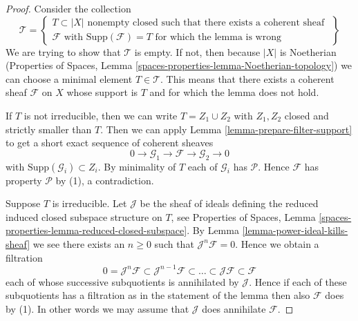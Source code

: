 \begin{proof}
Consider the collection
$$
\mathcal{T} =
\left\{
\begin{matrix}
T \subset |X|
\text{ nonempty closed such that there exists a coherent sheaf } \\
\mathcal{F}
\text{ with }
\text{Supp}(\mathcal{F}) = T
\text{ for which the lemma is wrong}
\end{matrix}
\right\}
$$
We are trying to show that $\mathcal{T}$ is empty. If not, then
because $|X|$ is Noetherian (Properties of Spaces, Lemma
\ref{spaces-properties-lemma-Noetherian-topology})
we can choose a minimal element $T \in \mathcal{T}$. This means that
there exists a coherent sheaf $\mathcal{F}$ on $X$ whose support is $T$
and for which the lemma does not hold.

\medskip\noindent
If $T$ is not irreducible, then we can write $T = Z_1 \cup Z_2$
with $Z_1, Z_2$ closed and strictly smaller than $T$.
Then we can apply Lemma \ref{lemma-prepare-filter-support}
to get a short exact sequence of coherent sheaves
$$
0 \to
\mathcal{G}_1 \to
\mathcal{F} \to
\mathcal{G}_2 \to 0
$$
with $\text{Supp}(\mathcal{G}_i) \subset Z_i$. By minimality of
$T$ each of $\mathcal{G}_i$ has $\mathcal{P}$. Hence $\mathcal{F}$
has property $\mathcal{P}$ by (1), a contradiction.

\medskip\noindent
Suppose $T$ is irreducible. Let $\mathcal{J}$ be the sheaf of ideals
defining the reduced induced closed subspace structure on $T$,
see Properties of Spaces, Lemma
\ref{spaces-properties-lemma-reduced-closed-subspace}.
By Lemma \ref{lemma-power-ideal-kills-sheaf} we see there exists
an $n \geq 0$ such that $\mathcal{J}^n\mathcal{F} = 0$. Hence we obtain
a filtration
$$
0 = \mathcal{J}^n\mathcal{F} \subset \mathcal{J}^{n - 1}\mathcal{F}
\subset \ldots \subset \mathcal{J}\mathcal{F} \subset \mathcal{F}
$$
each of whose successive subquotients is annihilated by $\mathcal{J}$.
Hence if each of these subquotients has a filtration as in the statement
of the lemma then also $\mathcal{F}$ does by (1). In other words we may
assume that $\mathcal{J}$ does annihilate $\mathcal{F}$.


\end{proof}
